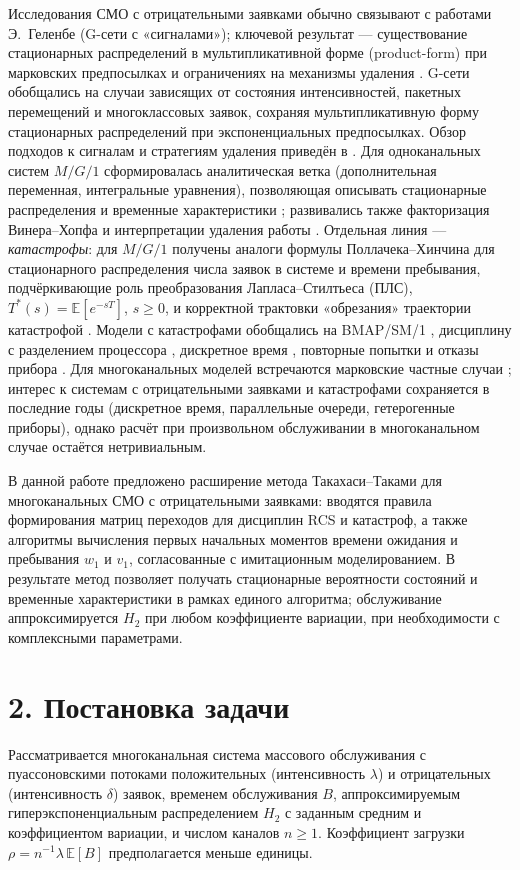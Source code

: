 Исследования СМО с отрицательными заявками обычно связывают с работами Э.~Геленбе (G-сети с «сигналами»); ключевой результат --- существование стационарных распределений в мультипликативной форме (product-form) при марковских предпосылках и ограничениях на механизмы удаления \cite{gelenbe1991,gelenbe1992}. G-сети обобщались на случаи зависящих от состояния интенсивностей, пакетных перемещений и многоклассовых заявок, сохраняя мультипликативную форму стационарных распределений при экспоненциальных предпосылках. 
Обзор подходов к сигналам и стратегиям удаления приведён в \cite{artalejo2000}. Для одноканальных систем \(M/G/1\) сформировалась аналитическая ветка (дополнительная переменная, интегральные уравнения), 
позволяющая описывать стационарные распределения и временные характеристики \cite{harrison1996}; развивались также факторизация Винера--Хопфа \cite{bayer1996} и интерпретации удаления работы \cite{boucherie1996}. 
Отдельная линия --- \emph{катастрофы}: для \(M/G/1\) получены аналоги формулы Поллачека--Хинчина для стационарного распределения числа заявок в системе и времени пребывания, подчёркивающие роль преобразования Лапласа--Стилтьеса (ПЛС), \(T^*(s)=\mathbb{E}[e^{-sT}]\), \(s\ge 0\), и корректной трактовки «обрезания» траектории катастрофой \cite{jain1996}. 
Модели с катастрофами обобщались на BMAP/SM/1 \cite{dudin1999}, дисциплину с разделением процессора \cite{li2006}, дискретное время \cite{atencia2004}, повторные попытки и отказы прибора \cite{artalejo1998,wang2008}. Для многоканальных моделей встречаются марковские частные случаи \cite{dharmaraja2015}; интерес к системам с отрицательными заявками и катастрофами сохраняется в последние годы (дискретное время, параллельные очереди, гетерогенные приборы), однако расчёт при произвольном обслуживании в многоканальном случае остаётся нетривиальным.

В данной работе предложено расширение метода Такахаси--Таками для многоканальных СМО с отрицательными заявками: вводятся правила формирования матриц переходов для дисциплин RCS и катастроф, а также алгоритмы вычисления первых начальных моментов времени ожидания и пребывания \(w_1\) и \(v_1\), согласованные с имитационным моделированием. В результате метод позволяет получать стационарные вероятности состояний и временные характеристики в рамках единого алгоритма; обслуживание аппроксимируется \(H_2\) при любом коэффициенте вариации, при необходимости с комплексными параметрами.

\section*{2. Постановка задачи}
Рассматривается многоканальная система массового обслуживания с пуассоновскими потоками положительных (интенсивность \(\lambda\)) и отрицательных (интенсивность \(\delta\)) заявок, временем обслуживания \(B\), аппроксимируемым гиперэкспоненциальным распределением \(H_2\) с заданным средним и коэффициентом вариации, и числом каналов \(n\ge 1\). Коэффициент загрузки \(\rho=n^{-1}\lambda\,\mathbb{E}[B]\) предполагается меньше единицы.

